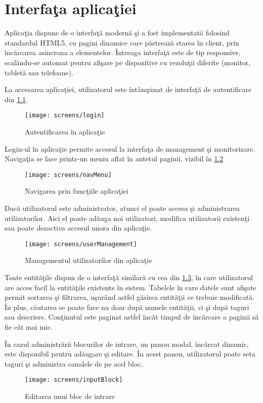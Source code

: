 \chapter{Interfaţa aplicaţiei}
\label{chapter:interfata}

Aplicaţia dispune de o interfaţă modernă şi a fost implementată folosind standardul HTML5, cu pagini dinamice care păstrează starea în client, prin încărcarea asincrona a elementelor. Întreaga interfaţă este de tip responsive, scalându-se automat pentru afişare pe dispozitive cu rezoluţii diferite (monitor,  tabletă sau telefoane).

La accesarea aplicaţiei, utilizatorul este întâmpinat de interfaţă de autentificare din \cref{fig:login}. 
\begin{figure}[H]
	\centering
	\texttt{[image: screens/login]}
	\captionsetup{justification=centering}
	\caption{Autentificarea în aplicaţie}
	\label{fig:login}
\end{figure}
Login-ul în aplicaţie permite accesul la interfaţa de management şi monitorizare. Navigaţia se face printr-un meniu aflat în antetul paginii, vizibil în \cref{fig:navMenu}
\begin{figure}[H]
	\centering
	\texttt{[image: screens/navMenu]}
	\captionsetup{justification=centering}
	\caption{Navigarea prin funcţiile aplicaţiei}
	\label{fig:navMenu}
\end{figure}
Dacă utilizatorul este administrator, atunci el poate accesa şi administrarea utilizatorilor. Aici el poate adăuga noi utilizatori, modifica utilizatorii existenţi sau poate dezactiva accesul unora din aplicaţie.
\begin{figure}[H]
	\centering
	\texttt{[image: screens/userManagement]}
	\captionsetup{justification=centering}
	\caption{Managementul utilizatorilor din aplicaţie}
	\label{fig:userManagement}
\end{figure}
Toate entităţile dispun de o interfaţă similară cu cea din \cref{fig:userManagement}, în care utilizatorul are acces facil la entităţile existente în sistem. Tabelele în care datele sunt afişate permit sortarea şi filtrarea, uşurând astfel găsirea entităţii ce trebuie modificată. În plus, căutarea se poate face nu doar după numele entităţii, ci şi după taguri sau descriere. Conţinutul este paginat astfel încât timpul de încărcare a paginii să fie cât mai mic.

În cazul administrării blocurilor de intrare, un panou modal, încărcat dinamic, este disponibil pentru adăugare şi editare. În acest panou, utilizatorul poate seta taguri şi administra canalele de pe acel bloc.
\begin{figure}[H]
	\centering
	\texttt{[image: screens/inputBlock]}
	\captionsetup{justification=centering}
	\caption{Editarea unui bloc de intrare}
	\label{fig:inputBlock}
\end{figure}

